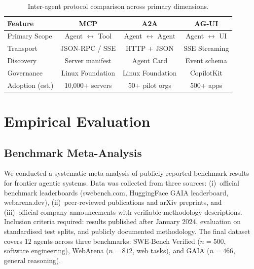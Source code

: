 \documentclass[sn-basic]{sn-jnl}
\theoremstyle{definition}
\begin{document}
\begin{table}[ht]
\centering
\caption{Inter-agent protocol comparison across primary dimensions.}
\label{tab:protocols}
\begin{tabular}{lccc}
\toprule
\textbf{Feature} & \textbf{MCP} & \textbf{A2A} & \textbf{AG-UI} \\
\midrule
Primary Scope        & Agent $\leftrightarrow$ Tool & Agent $\leftrightarrow$ Agent & Agent $\leftrightarrow$ UI \\
Transport            & JSON-RPC / SSE               & HTTP + JSON                   & SSE Streaming \\
Discovery            & Server manifest              & Agent Card                    & Event schema \\
Governance           & Linux Foundation             & Linux Foundation              & CopilotKit \\
Adoption (est.)      & 10,000+ servers              & 50+ pilot orgs                & 500+ apps \\
\bottomrule
\end{tabular}
\end{table}

\section{Empirical Evaluation}\label{sec:evaluation}

\subsection{Benchmark Meta-Analysis}\label{sec:benchmarks}

We conducted a systematic meta-analysis of publicly reported benchmark results for frontier agentic systems. Data was collected from three sources: (i)~official benchmark leaderboards (swebench.com, HuggingFace GAIA leaderboard, webarena.dev), (ii)~peer-reviewed publications and arXiv preprints, and (iii)~official company announcements with verifiable methodology descriptions. Inclusion criteria required: results published after January 2024, evaluation on standardised test splits, and publicly documented methodology. The final dataset covers 12 agents across three benchmarks: SWE-Bench Verified \citep{jimenez2024swebench} ($n=500$, software engineering), WebArena \citep{zhou2024webarena} ($n=812$, web tasks), and GAIA \citep{mialon2023gaia} ($n=466$, general reasoning).
\end{document}
